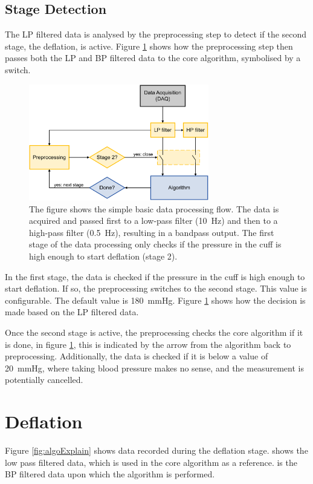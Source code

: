 \subsection{Stage Detection}
The LP filtered data is analysed by the preprocessing step to detect if the second stage, the deflation, is active. Figure \ref{fig:algoP} shows how the preprocessing step then passes both the LP and BP filtered data to the core algorithm, symbolised by a switch. 

\begin{figure}[ht]
\centering
\includegraphics[width=0.7\textwidth]{figures/algo_process.pdf}
\caption{The figure shows the simple basic data processing flow. The data is acquired and passed first to a low-pass filter (\SI{10}{\Hz}) and then to a high-pass filter (\SI{0.5}{\Hz}), resulting in a bandpass output. The first stage of the data processing only checks if the pressure in the cuff is high enough to start deflation (stage 2).}
\label{fig:algoP}
\end{figure}

In the first stage, the data is checked if the pressure in the cuff is high enough to start deflation. If so, the preprocessing switches to the second stage. This value is configurable. The default value is \SI{180}{\mmHg}. Figure \ref{fig:algoP} shows how the decision is made based on the LP filtered data.  

Once the second stage is active, the preprocessing checks the core algorithm if it is done, in figure \ref{fig:algoP}, this is indicated by the arrow from the algorithm back to preprocessing. Additionally, the data is checked if it is below a value of \SI{20}{\mmHg}, where taking blood pressure makes no sense, and the measurement is potentially cancelled.

\newpage


\section{Deflation}\label{sec:Deflation}
Figure \ref{fig:algoExplain} shows data recorded during the deflation stage.  shows the low pass filtered data, which is used in the core algorithm as a reference.  is the BP filtered data upon which the algorithm is performed. 


